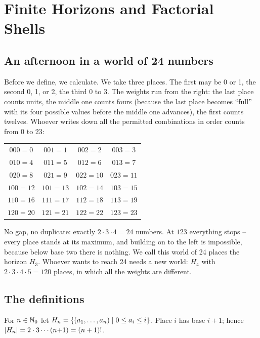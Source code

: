 \chapter{Finite Horizons and Factorial Shells}
\label{ch:horizonte}


\section{An afternoon in a world of 24 numbers}

Before we define, we calculate. We take three places. The first may
be 0 or 1, the second 0, 1, or 2, the third 0 to 3. The weights run
from the right: the last place counts units, the middle one counts
fours (because the last place becomes ``full'' with its four possible
values before the middle one advances), the first counts twelves.
Whoever writes down all the permitted combinations in order counts
from 0 to 23:

\begin{center}
\begin{tabular}{cccc}
$000=0$ & $001=1$ & $002=2$ & $003=3$\\
$010=4$ & $011=5$ & $012=6$ & $013=7$\\
$020=8$ & $021=9$ & $022=10$ & $023=11$\\
$100=12$ & $101=13$ & $102=14$ & $103=15$\\
$110=16$ & $111=17$ & $112=18$ & $113=19$\\
$120=20$ & $121=21$ & $122=22$ & $123=23$\\
\end{tabular}
\end{center}

No gap, no duplicate: exactly $2\cdot3\cdot4=24$ numbers. At $123$
everything stops -- every place stands at its maximum, and building
on to the left is impossible, because below base two there is
nothing. We call this world of 24 places the horizon $H_3$. Whoever
wants to reach 24 needs a new world: $H_4$ with
$2\cdot3\cdot4\cdot5=120$ places, in which all the weights are
different.

\section{The definitions}

\begin{definition}
For $n\in\mathbb N_0$ let
$H_{n}=\{(a_1,\ldots,a_n)\mid 0\le a_i\le i\}$.
Place $i$ has base $i+1$; hence
$|H_{n}|=2\cdot3\cdots(n{+}1)=(n+1)!$.
\end{definition}

